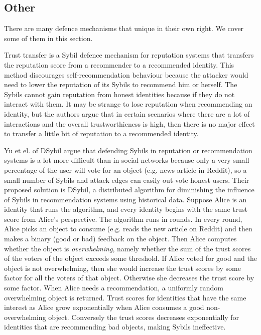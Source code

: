 
\subsection{Other}
There are many defence mechanisms that unique in their own right. We cover some
of them in this section.

Trust transfer\cite{seigneur2005trust} is a Sybil defence mechanism for
reputation systems that transfers the reputation score from a recommender to a
recommended identity. This method discourages self-recommendation behaviour
because the attacker would need to lower the reputation of its Sybils to
recommend him or herself. The Sybils cannot gain reputation from honest
identities because if they do not interact with them. It may be strange to lose
reputation when recommending an identity, but the authors argue that in certain
scenarios where there are a lot of interactions and the overall trustworthieness
is high, then there is no major effect to transfer a little bit of reputation to
a recommended identity.

Yu et el. of DSybil\cite{yu2009dsybil} argue that defending Sybils in reputation
or recommendation systems is a lot more difficult than in social networks
because only a very small percentage of the user will vote for an object (e.g.
news article in Reddit), so a small number of Sybils and attack edges can easily
out-vote honest users. Their proposed solution is DSybil, a distributed
algorithm for diminishing the influence of Sybils in recommendation systems
using historical data. Suppose Alice is an identity that runs the algorithm, and
every identity begins with the same trust score from Alice's perspective. The
algorithm runs in rounds. In every round, Alice picks an object to consume (e.g.
reads the new article on Reddit) and then makes a binary (good or bad) feedback
on the object. Then Alice computes whether the object is \emph{overwhelming},
namely whether the sum of the trust scores of the voters of the object exceeds
some threshold. If Alice voted for good and the object is not overwhelming, then
she would increase the trust scores by some factor for all the voters of that
object. Otherwise she decreases the trust score by some factor. When Alice needs
a recommendation, a uniformly random overwhelming object is returned. Trust
scores for identities that have the same interest as Alice grow exponentially
when Alice consumes a good non-overwhelming object. Conversely the trust scores
decreases exponentially for identities that are recommending bad objects, making
Sybils ineffective.

